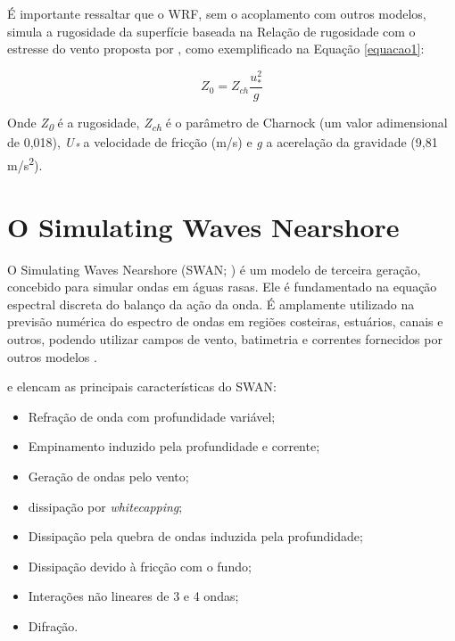 \noindent É importante ressaltar que o WRF, sem o acoplamento com outros modelos, simula a rugosidade da superfície baseada na Relação de rugosidade com o estresse do vento proposta por \textcite{Charnock1955}, como exemplificado na Equação \textcolor{bleu_cite}{\ref{equacao1}}:
\bigskip

\begin{equation}
Z_{0} = Z_{ch} \frac{u_{*}^{2}}{g}
\label{equacao1}
\end{equation}

\bigskip

\noindent Onde \textit{Z\textsubscript{0}} é a rugosidade, \textit{Z\textsubscript{ch}} é o parâmetro de Charnock (um valor adimensional de 0,018), \textit{U\textsubscript{*}} a velocidade de fricção (m/s) e \textit{g} a acerelação da gravidade (9,81 m/s\textsuperscript{2}).
\bigskip


\section{O Simulating Waves Nearshore}
\bigskip

\noindent O Simulating Waves Nearshore (SWAN; \cite{Booij1999,Booij1996}) é um modelo de terceira geração, concebido para simular ondas em águas rasas. Ele é fundamentado na equação espectral discreta do balanço da ação da onda. É amplamente utilizado na previsão numérica do espectro de ondas em regiões costeiras, estuários, canais e outros, podendo utilizar campos de vento, batimetria e correntes fornecidos por outros modelos \parencite{Booij1999,Booij1996}.
\bigskip

\noindent \textcite{Dasilva2013} e \textcite{Booij1999,Booij1996} elencam as principais características do SWAN:
\bigskip

\begin{itemize}
\item Refração de onda com profundidade variável;
\item Empinamento induzido pela profundidade e corrente;
\item Geração de ondas pelo vento;
\item dissipação por \textit{whitecapping};
\item Dissipação pela quebra de ondas induzida pela profundidade;
\item Dissipação devido à fricção com o fundo;
\item Interações não lineares de 3 e 4 ondas;
\item Difração.
\end{itemize}
\bigskip

